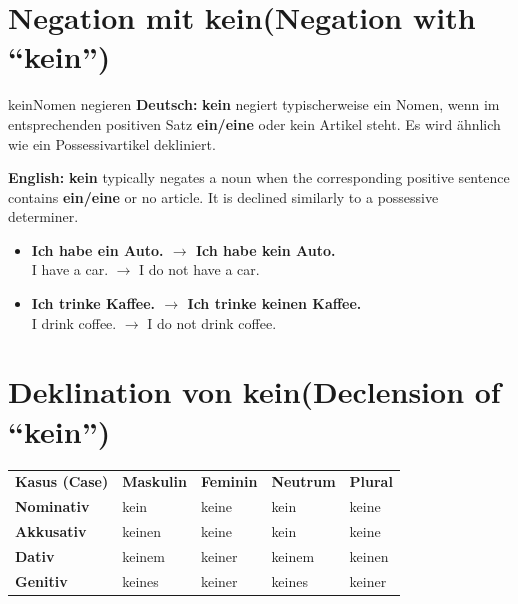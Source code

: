 \documentclass[a4paper,11pt]{article}
\newcommand{\GermanText}[1]{\textbf{Deutsch: }#1\par}
\newcommand{\EnglishText}[1]{{\small\color{SoftGray}\textbf{English: }#1\par}}
\newcommand{\ExampleItem}[2]{\item \textbf{#1}\\{\small\color{SoftGray}#2}}
\begin{document}
\section{Negation mit \glqq kein\grqq \textnormal{(Negation with ``kein'')}}
\begin{grammarentry}{kein}{Nomen negieren}
\GermanText{\textbf{kein} negiert typischerweise ein Nomen, wenn im entsprechenden positiven Satz \textbf{ein/eine} oder kein Artikel steht. Es wird ähnlich wie ein Possessivartikel dekliniert.}
\EnglishText{\textbf{kein} typically negates a noun when the corresponding positive sentence contains \textbf{ein/eine} or no article. It is declined similarly to a possessive determiner.}
\end{grammarentry}
\begin{exbox}\begin{itemize}
\ExampleItem{Ich habe ein Auto. $\rightarrow$ Ich habe kein Auto.}{I have a car. $\rightarrow$ I do not have a car.}
\ExampleItem{Ich trinke Kaffee. $\rightarrow$ Ich trinke keinen Kaffee.}{I drink coffee. $\rightarrow$ I do not drink coffee.}
\end{itemize}\end{exbox}

\section{Deklination von \glqq kein\grqq \textnormal{(Declension of ``kein'')}}
\begin{longtable}{>{\bfseries}p{2.5cm}|p{2.6cm}|p{2.6cm}|p{2.6cm}|p{2.6cm}}
\rowcolor{HeaderBlueDark}
\color{white}\textbf{Kasus (Case)} & \color{white}\textbf{Maskulin} & \color{white}\textbf{Feminin} & \color{white}\textbf{Neutrum} & \color{white}\textbf{Plural}\\
Nominativ & kein & keine & kein & keine\\
Akkusativ & keinen & keine & kein & keine\\
Dativ & keinem & keiner & keinem & keinen\\
Genitiv & keines & keiner & keines & keiner\\
\end{longtable}
\end{document}
